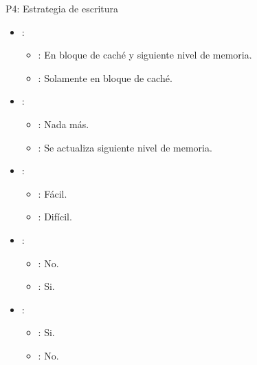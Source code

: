 \begin{frame}[t,shrink=10]{P4: Estrategia de escritura}
\begin{itemize}
  \item {}:
    \begin{itemize}
      \item {}: En bloque de caché y siguiente nivel de memoria.
      \item {}: Solamente en bloque de caché.
    \end{itemize}

  \item {}:
    \begin{itemize}
      \item {}: Nada más.
      \item {}: Se actualiza siguiente nivel de memoria.
    \end{itemize}

  \item {}:
    \begin{itemize}
      \item {}: Fácil.
      \item {}: Difícil.
    \end{itemize}

  \item {}:
    \begin{itemize}
      \item {}: No.
      \item {}: Si.
    \end{itemize}

  \item {}:
    \begin{itemize}
      \item {}: Si.
      \item {}: No.
    \end{itemize}
\end{itemize}
\end{frame}


